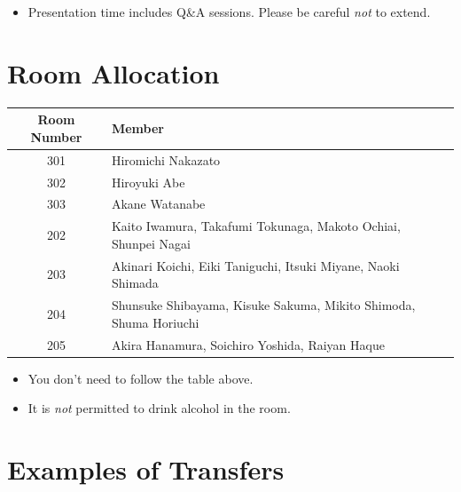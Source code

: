\documentclass[unicode,a4paper,11pt]{ltjsarticle}
\begin{document}
\begin{itemize}
  \item
        Presentation time includes Q\&A sessions. Please be careful \textit{not} to extend.
\end{itemize}

\section{Room Allocation}

\begin{center}
  \begin{tabular}{cl}\hline
    Room Number & Member                                                            \\ \hline
    301         & Hiromichi Nakazato                                                \\
    302         & Hiroyuki Abe                                                      \\
    303         & Akane Watanabe                                                    \\
    202         & Kaito Iwamura, Takafumi Tokunaga, Makoto Ochiai, Shunpei Nagai    \\
    203         & Akinari Koichi, Eiki Taniguchi, Itsuki Miyane, Naoki Shimada      \\
    204         & Shunsuke Shibayama, Kisuke Sakuma, Mikito Shimoda, Shuma Horiuchi \\
    205         & Akira Hanamura, Soichiro Yoshida, Raiyan Haque                    \\ \hline
  \end{tabular}
\end{center}

\begin{itemize}
  \item
        You don't need to follow the table above.
  \item
        It is \textit{not} permitted to drink alcohol in the room.
\end{itemize}


\section{Examples of Transfers}

\vspace*{5pt}
\end{document}

